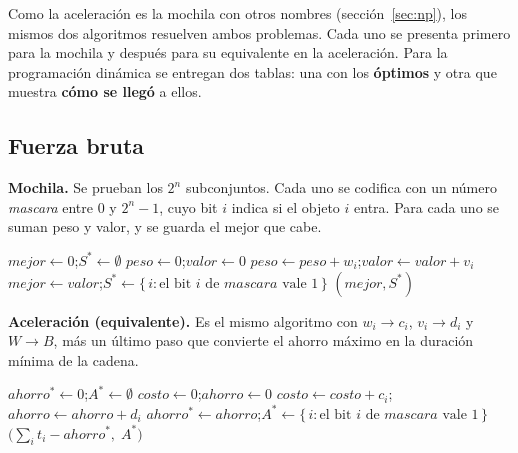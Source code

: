\documentclass[11pt,a4paper]{article}
\theoremstyle{plano}
\begin{document}
Como la aceleración es la mochila con otros nombres (sección~\ref{sec:np}), los mismos dos algoritmos resuelven ambos problemas. Cada uno se presenta primero para la mochila y después para su equivalente en la aceleración. Para la programación dinámica se entregan dos tablas: una con los \textbf{óptimos} y otra que muestra \textbf{cómo se llegó} a ellos.

\subsection{Fuerza bruta}

\textbf{Mochila.} Se prueban los $2^n$ subconjuntos. Cada uno se codifica con un número \textit{mascara} entre $0$ y $2^n-1$, cuyo bit $i$ indica si el objeto $i$ entra. Para cada uno se suman peso y valor, y se guarda el mejor que cabe.

\begin{algorithm}[h]
\caption{\textsc{Mochila-FB}$(w,v,W,n)$}
\begin{algorithmic}[1]
\State $mejor\gets 0$;\quad $S^*\gets\emptyset$
  \State $peso\gets 0$;\quad $valor\gets 0$
      \State $peso\gets peso+w_i$;\quad $valor\gets valor+v_i$
    \EndIf
  \EndFor
    \State $mejor\gets valor$;\quad $S^*\gets\{\,i : \text{el bit } i \text{ de } mascara \text{ vale } 1\,\}$
  \EndIf
\EndFor
\State \Return $(mejor,S^*)$
\end{algorithmic}
\end{algorithm}

\textbf{Aceleración (equivalente).} Es el mismo algoritmo con $w_i\to c_i$, $v_i\to d_i$ y $W\to B$, más un último paso que convierte el ahorro máximo en la duración mínima de la cadena.

\begin{algorithm}[h]
\caption{\textsc{Aceleración-FB}$(t,c,d,B,n)$}
\begin{algorithmic}[1]
\State $ahorro^*\gets 0$;\quad $A^*\gets\emptyset$
  \State $costo\gets 0$;\quad $ahorro\gets 0$
      \State $costo\gets costo+c_i$;\quad $ahorro\gets ahorro+d_i$
    \EndIf
  \EndFor
    \State $ahorro^*\gets ahorro$;\quad $A^*\gets\{\,i : \text{el bit } i \text{ de } mascara \text{ vale } 1\,\}$
  \EndIf
\EndFor
\State \Return $\bigl(\sum_i t_i-ahorro^*,\;A^*\bigr)$
\end{algorithmic}
\end{algorithm}
\end{document}
